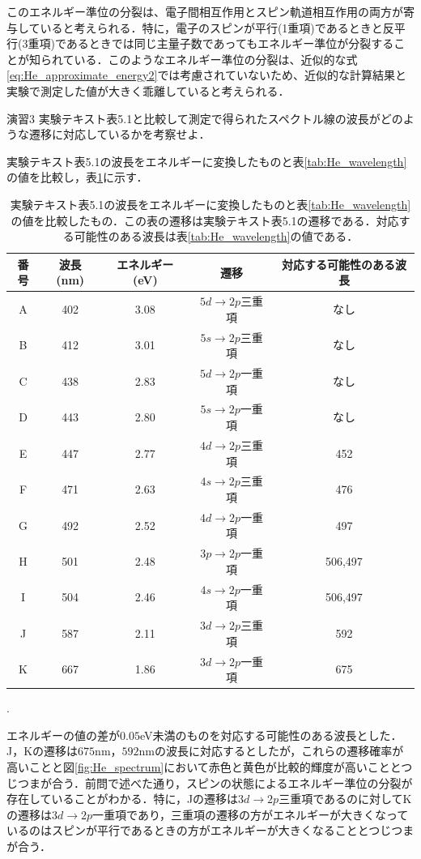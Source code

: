 \documentclass[a4paper,dvipdfmx,10.5pt]{jarticle}
\begin{document}
 このエネルギー準位の分裂は、電子間相互作用とスピン軌道相互作用の両方が寄与していると考えられる．特に，電子のスピンが平行(1重項)であるときと反平行(3重項)であるときでは同じ主量子数であってもエネルギー準位が分裂することが知られている．このようなエネルギー準位の分裂は、近似的な式\eqref{eq:He_approximate_energy2}では考慮されていないため、近似的な計算結果と実験で測定した値が大きく乖離していると考えられる．
\begin{itembox}[l]{演習3}
  実験テキスト表5.1と比較して測定で得られたスペクトル線の波長がどのような遷移に対応しているかを考察せよ．
\end{itembox}
\quad 実験テキスト表5.1の波長をエネルギーに変換したものと表\ref{tab:He_wavelength}の値を比較し，表\ref{tab:He_transition}に示す．
\begin{table}[htbp]
  \begin{center}
    \begin{tabular}{|c|c|c|c|c|}
       \hline
    番号 & 波長(nm) & エネルギー(eV) & 遷移 & 対応する可能性のある波長 \\
      \hline
    A & 402 & 3.08 & $5d\to 2p$三重項& なし\\
    B & 412 & 3.01 & $5s\to 2p$三重項& なし\\
    C & 438 & 2.83 & $5d\to 2p$一重項& なし\\
    D & 443 & 2.80 & $5s\to 2p$一重項& なし\\
    E & 447 & 2.77 & $4d\to 2p$三重項& 452\\
    F & 471 & 2.63 & $4s\to 2p$三重項& 476\\
    G & 492 & 2.52 & $4d\to 2p$一重項& 497\\
    H & 501 & 2.48 & $3p\to 2p$一重項& 506,497\\
    I & 504 & 2.46 & $4s\to 2p$一重項& 506,497\\
    J & 587 & 2.11 & $3d\to 2p$三重項& 592\\
    K & 667 & 1.86 & $3d\to 2p$一重項& 675\\
    \hline
    \end{tabular}
    \caption{実験テキスト表5.1の波長をエネルギーに変換したものと表\ref{tab:He_wavelength}の値を比較したもの．この表の遷移は実験テキスト表5.1の遷移である．対応する可能性のある波長は表\ref{tab:He_wavelength}の値である．}
    .\label{tab:He_transition}
  \end{center}
\end{table}
エネルギーの値の差が$0.05$eV未満のものを対応する可能性のある波長とした．J，Kの遷移は$675$nm，$592$nmの波長に対応するとしたが，これらの遷移確率が高いことと図\ref{fig:He_spectrum}において赤色と黄色が比較的輝度が高いこととつじつまが合う．前問で述べた通り，スピンの状態によるエネルギー準位の分裂が存在していることがわかる．特に，Jの遷移は$3d\to 2p$三重項であるのに対してKの遷移は$3d\to 2p$一重項であり，三重項の遷移の方がエネルギーが大きくなっているのはスピンが平行であるときの方がエネルギーが大きくなることとつじつまが合う．
\end{document}
